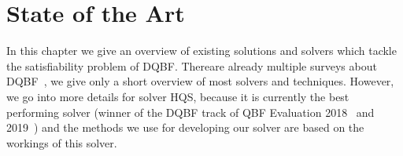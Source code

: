 \documentclass[
  digital, %
  twoside, %
  table,   %
  nolof,     %
  nolot,     %
]{fithesis3}
\theoremstyle{definition}
\theoremstyle{remark}
\begin{document}
\chapter{State of the Art}




In this chapter we give an overview of existing solutions and solvers which tackle the satisfiability problem of DQBF. Thereare already multiple surveys about DQBF~\cite{DQBFStateOfArtTalk,DQBFStateOfArt,DQBFStateOfArtNew}, we give only a short overview of most solvers and techniques. %
However, we go into more details for solver HQS, because it is currently the best performing solver (winner of the DQBF track of QBF Evaluation 2018~\cite{QBFeval18} and 2019~\cite{QBFeval19}) and the methods we use for developing our solver are based on the workings of this solver.

\end{document}
